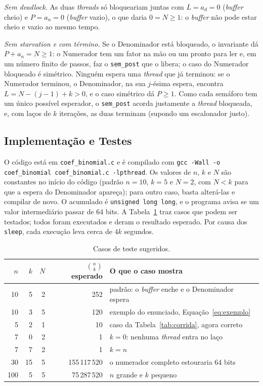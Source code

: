 \documentclass[a4paper, 12pt]{article}
\begin{document}
\emph{Sem deadlock.} As duas \emph{threads} só bloqueariam juntas com
$L = a_d = 0$ (\emph{buffer} cheio) e $P = a_n = 0$ (\emph{buffer} vazio), o
que daria $0 = N \ge 1$: o \emph{buffer} não pode estar cheio e vazio ao
mesmo tempo.

\emph{Sem starvation e com término.} Se o Denominador está bloqueado, o
invariante dá $P + a_n = N \ge 1$: o Numerador tem um fator na mão ou um
pronto para ler e, em um número finito de passos, faz o \texttt{sem\_post}
que o libera; o caso do Numerador bloqueado é simétrico. Ninguém espera uma
\emph{thread} que já terminou: se o Numerador terminou, o Denominador, na sua
$j$-ésima espera, encontra $L = N - (j-1) + k > 0$, e o caso simétrico dá
$P \ge 1$. Como cada semáforo tem um único possível esperador, o
\texttt{sem\_post} acorda justamente a \emph{thread} bloqueada, e, com laços
de $k$ iterações, as duas terminam (supondo um escalonador justo).


\subsection{Implementação e Testes}

O código está em \texttt{coef\_binomial.c} e é compilado com
\texttt{gcc -Wall -o coef\_binomial coef\_binomial.c -lpthread}. Os valores
de $n$, $k$ e $N$ são constantes no início do código (padrão $n = 10$,
$k = 5$ e $N = 2$, com $N < k$ para que a espera do Denominador apareça);
para outro caso, basta alterá-las e compilar de novo. O acumulado é
\texttt{unsigned long long}, e o programa avisa se um valor intermediário
passar de 64 bits. A Tabela~\ref{tab:testes} traz casos que podem ser
testados; todos foram executados e deram o resultado esperado. Por causa dos
\texttt{sleep}, cada execução leva cerca de $4k$ segundos.

\begin{table}[H]
\centering
\caption{Casos de teste sugeridos.}
\label{tab:testes}
\small
\begin{tabular}{rrrrl}
\hline
$n$ & $k$ & $N$ & $\binom{n}{k}$ esperado & O que o caso mostra \\
\hline
10  & 5  & 2 & 252           & padrão: o \emph{buffer} enche e o Denominador espera \\
10  & 3  & 5 & 120           & exemplo do enunciado, Equação~\eqref{eq:exemplo} \\
5   & 2  & 1 & 10            & caso da Tabela~\ref{tab:corrida}, agora correto \\
7   & 0  & 2 & 1             & $k = 0$: nenhuma \emph{thread} entra no laço \\
7   & 7  & 2 & 1             & $k = n$ \\
30  & 15 & 5 & 155\,117\,520 & o numerador completo estouraria 64 bits \\
100 & 5  & 5 & 75\,287\,520  & $n$ grande e $k$ pequeno \\
\hline
\end{tabular}
\end{table}
\end{document}
